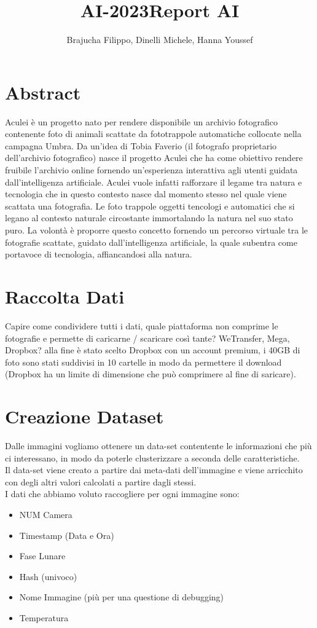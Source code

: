 \title{AI-2023}\documentclass[12pt,a4paper,twoside]{article}
\author{Brajucha Filippo, Dinelli Michele, Hanna Youssef}
\title{Report AI}
\begin{document}
\maketitle

\section*{Abstract}
Aculei è un progetto nato per rendere disponibile un archivio fotografico contenente foto di animali 
scattate da fototrappole automatiche collocate nella campagna Umbra. Da un'idea di Tobia Faverio 
(il fotografo proprietario dell'archivio fotografico) nasce il progetto Aculei che ha come obiettivo 
rendere fruibile l'archivio online fornendo un'esperienza interattiva agli utenti guidata
dall'intelligenza artificiale. Aculei vuole infatti rafforzare il legame tra natura e tecnologia 
che in questo contesto nasce dal momento stesso nel quale viene scattata una fotografia. Le foto trappole 
oggetti tencologi e automatici che si legano al contesto naturale circostante immortalando la natura 
nel suo stato puro. La volontà è proporre questo concetto fornendo un percorso virtuale tra le 
fotografie scattate, guidato dall'intelligenza artificiale, la quale subentra come portavoce di tecnologia, 
affiancandosi alla natura.       
\newpage

\tableofcontents

\newpage

\section{Raccolta Dati}
Capire come condividere tutti i dati, quale piattaforma non comprime le fotografie e permette di caricarne /
scaricare così tante? WeTransfer, Mega, Dropbox? alla fine è stato scelto Dropbox con un account premium, i 
40GB di foto sono stati suddivisi in 10 cartelle in modo da permettere il download (Dropbox ha un limite di 
dimensione che può comprimere al fine di saricare).

\section{Creazione Dataset}
Dalle immagini vogliamo ottenere un data-set contentente le informazioni che più ci interessano, in modo da 
poterle clusterizzare a seconda delle caratteristiche.\\
Il data-set viene creato a partire dai meta-dati dell'immagine e viene arricchito con degli altri valori
calcolati a partire dagli stessi.\\
I dati che abbiamo voluto raccogliere per ogni immagine sono:
\begin{itemize}
    \item NUM Camera
    \item Timestamp (Data e Ora)
    \item Fase Lunare
    \item Hash (univoco)
    \item Nome Immagine (più per una questione di debugging)
    \item Temperatura
\end{itemize}
\end{document}
